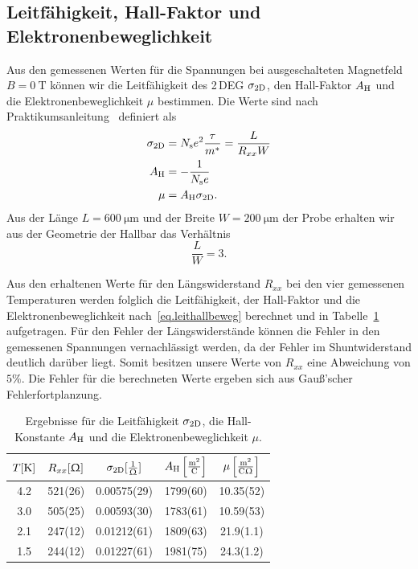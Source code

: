 \documentclass[paper=a4,fontsize=10pt,DIV=18,twocolumn,parskip=half]{scrartcl}
\numberwithin{equation}{section}    %
\begin{document}
\subsection{Leitfähigkeit, Hall-Faktor und Elektronenbeweglichkeit}
\label{a3}

Aus den gemessenen Werten für die Spannungen bei ausgeschalteten Magnetfeld $B=\SI{0}{\tesla}$ können wir die Leitfähigkeit des 2\,DEG $\sigma_{\rm 2D}$, den Hall-Faktor $A_{\rm H}$ und die Elektronenbeweglichkeit $\mu$ bestimmen. Die Werte sind nach Praktikumsanleitung~\citep{anleitung} definiert als
\begin{align}
	\sigma_{\rm 2D} &= N_{\rm s} e^2 \frac{\tau}{m^*} = \frac{L}{R_{xx} W}\\
	A_{\rm H} 		&= -\frac{1}{N_{\rm s}e}\\
	\mu 			&= A_{\rm H} \sigma_{\rm 2D}.
	\label{eq.leithallbeweg}
\end{align}
Aus der Länge $L=\SI{600}{\micro\meter}$ und der Breite $W=\SI{200}{\micro\meter}$ der Probe erhalten wir aus der Geometrie der Hallbar das Verhältnis
\begin{equation}
	\frac{L}{W} = 3.
\end{equation}

Aus den erhaltenen Werte für den Längswiderstand $R_{xx}$ bei den vier gemessenen Temperaturen werden folglich die Leitfähigkeit, der Hall-Faktor und die Elektronenbeweglichkeit nach~\eqref{eq.leithallbeweg} berechnet und in Tabelle~\ref{tab.leithallbeweg} aufgetragen. Für den Fehler der Längswiderstände können die Fehler in den gemessenen Spannungen vernachlässigt werden, da der Fehler im Shuntwiderstand deutlich darüber liegt. Somit besitzen unsere Werte von $R_{xx}$ eine Abweichung von $5\%$. Die Fehler für die berechneten Werte ergeben sich aus Gauß'scher Fehlerfortplanzung.

\begin{table}[htp]
	\begin{center}
		\begin{tabular}{ccccc}
			\hline
			$T[\rm K]$ & $R_{xx}[\Upomega]$ & $\sigma_{\rm 2D}[\frac{1}{\Upomega}]$ & $A_{\rm H}\left[ \frac{\mathrm{m}^2}{\mathrm{C}} \right]$ & $\mu \left[ \frac{\mathrm{m}^2}{\mathrm{C}\Upomega} \right]$\\
			\hline
			4.2 & 521(26) & 0.00575(29) & 1799(60) & 10.35(52)\\
			3.0 & 505(25) & 0.00593(30) & 1783(61) & 10.59(53)\\
			2.1 & 247(12) & 0.01212(61) & 1809(63) & 21.9(1.1)\\
			1.5 & 244(12) & 0.01227(61) & 1981(75) & 24.3(1.2)\\
			\hline
		\end{tabular}
		\caption{Ergebnisse für die Leitfähigkeit $\sigma_{\rm 2D}$, die Hall-Konstante $A_{\rm H}$ und die Elektronenbeweglichkeit $\mu$.}
		\label{tab.leithallbeweg}
	\end{center}
\end{table}
%
~~~~~~~~~~~~~~~~~~~~~~~~~~~~~~~~~~~~~~~~~~~~~~~~~~~~~~~~~~~~~~~~~~~~~~~~~~~~~
\end{document}
